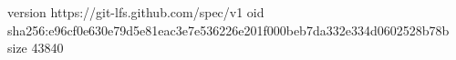 version https://git-lfs.github.com/spec/v1
oid sha256:e96cf0e630e79d5e81eac3e7e536226e201f000beb7da332e334d0602528b78b
size 43840
